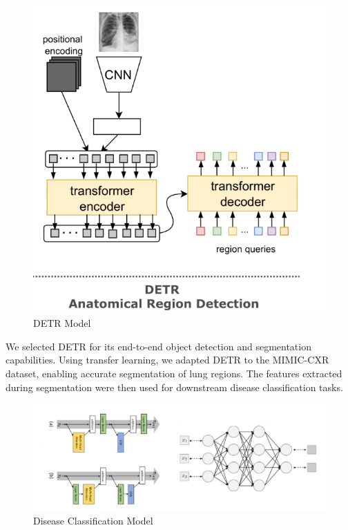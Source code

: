 \documentclass[10pt,twocolumn,letterpaper]{article}
\begin{document}
\begin{figure}[H]
    \centering
    \includegraphics[width=1\linewidth]{assets/DETR.png}
    \caption{DETR Model}
    \label{fig:enter-label}
\end{figure}

We selected DETR for its end-to-end object detection and segmentation capabilities. Using transfer learning, we adapted DETR to the MIMIC-CXR dataset, enabling accurate segmentation of lung regions. The features extracted during segmentation were then used for downstream disease classification tasks.\\

\begin{figure}[H]
    \centering
    \includegraphics[width=1\linewidth]{assets/Disease_Classification.png}
    \caption{Disease Classification Model}
    \label{fig:enter-label}
\end{figure}
\end{document}
